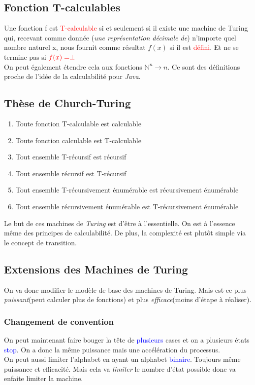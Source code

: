 \documentclass{report}
\begin{document}
\subsection{Fonction T-calculables}
Une fonction f est \textcolor{red}{T-calculable} si et seulement si il existe une machine de Turing qui, recevant comme donnée (\textit{une représentation décimale de}) n'importe quel nombre naturel x, nous fournit comme résultat $f(x)$ si il est \textcolor{red}{défini}. Et ne se termine pas si $\textcolor{red}{f(x) = \perp}$\\
On peut également étendre cela aux fonctions $\mathbb{N}^n \rightarrow n$. Ce sont des définitions proche de l'idée de la calculabilité pour \textit{Java}.

\subsection{Thèse de Church-Turing}
\begin{enumerate}
\item Toute fonction T-calculable est calculable
\item Toute fonction calculable est T-calculable
\item Tout ensemble T-récursif est récursif
\item Tout ensemble récursif est T-récursif
\item Tout ensemble T-récursivement énumérable est récursivement énumérable
\item Tout ensemble récursivement énumérable est T-récursivement énumérable
\end{enumerate}
Le but de ces machines de \textit{Turing} est d'être à l'essentielle. On est à l'essence même des principes de calculabilité. De plus, la complexité est plutôt simple via le concept de transition.

\subsection{Extensions des Machines de Turing}
On va donc modifier le modèle de base des machines de Turing. Mais est-ce plus \textit{puissant}(peut calculer plus de fonctions) et plus \textit{efficace}(moins d'étape à réaliser).

\subsubsection{Changement de convention}
On peut maintenant faire bouger la tête de \textcolor{blue}{plusieurs} cases et on a plusieurs états \textcolor{blue}{stop}. On a donc la même puissance mais une accélération du processus.\\
On peut aussi limiter l'alphabet en ayant un alphabet \textcolor{blue}{binaire}. Toujours même puissance et efficacité. Mais cela va \textit{limiter} le nombre d'état possible donc va enfaite limiter la machine.\\
\end{document}
